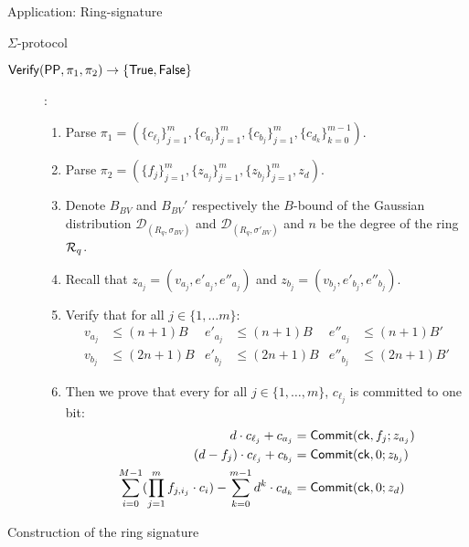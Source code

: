 \begin{section}{Application: Ring-signature}
\begin{subsection}{$\Sigma$-protocol}
\begin{description}
        \item [${\mathsf{Verify}}({\mathsf{PP}}, \pi_1, \pi_2) \to \{\mathsf{True}, \mathsf{False}\}$]:
        \begin{enumerate}
          \item Parse $\pi_1 = (\{c_{\ell_j}\}_{j = 1}^m, \{c_{a_j}\}_{j = 1}^m,\{c_{b_j}\}_{j = 1}^m,\{c_{d_k}\}_{k = 0}^{m-1})$.
          \item Parse $\pi_2 = (\{f_j\}_{j = 1}^m, \{z_{a_j}\}_{j = 1}^m, \{z_{b_j}\}_{j = 1}^m, z_d)$.
          \item Denote $B_{BV}$ and $B_{BV}'$ respectively the $B$-bound of the Gaussian distribution $\mathcal{D}_{(R_q, \sigma_{BV})}$ and $\mathcal{D}_{(R_q, \sigma'_{BV})}$ and $n$ be the degree of the ring ${\mathcal{R}}_q$.
          \item Recall that $z_{a_j} = (v_{a_j}, e'_{a_j}, e''_{a_j})$ and $z_{b_j} = (v_{b_j}, e'_{b_j}, e''_{b_j})$.
          \item Verify that for all $j \in \{1, \dots m\}$:
          \begin{align*}
            v_{a_j} &\leq (n+1) B & e'_{a_j} &\leq (n+1) B & e''_{a_j} &\leq (n+1) B'\\
            v_{b_j} &\leq (2n+1) B & e'_{b_j} &\leq (2n+1) B & e''_{b_j} &\leq (2n+1) B'
          \end{align*}
          \item Then we prove that every for all $j \in \{1, \dots, m\}$, $c_{\ell_j}$ is committed to one bit:
          \begin{align*}
            d \cdot c_{\ell_j} + c_{a_j} &= {\mathsf{Commit}}(\mathsf{ck}, f_j ; z_{a_j})\\
            (d-f_{j}) \cdot c_{\ell_j} + c_{b_j} &= {\mathsf{Commit}}(\mathsf{ck}, 0; z_{b_j})\\
            \sum_{i = 0}^{M-1}(\prod_{j = 1}^{m} f_{j,i_j} \cdot c_i) - \sum_{k = 0}^{m-1} d^{k} \cdot c_{d_{k}} & = {\mathsf{Commit}}(\mathsf{ck}, 0; z_d)
          \end{align*}
        \end{enumerate}
    \end{description}
  \end{subsection}

  \begin{subsection}{Construction of the ring signature}


\end{subsection}
\end{section}
